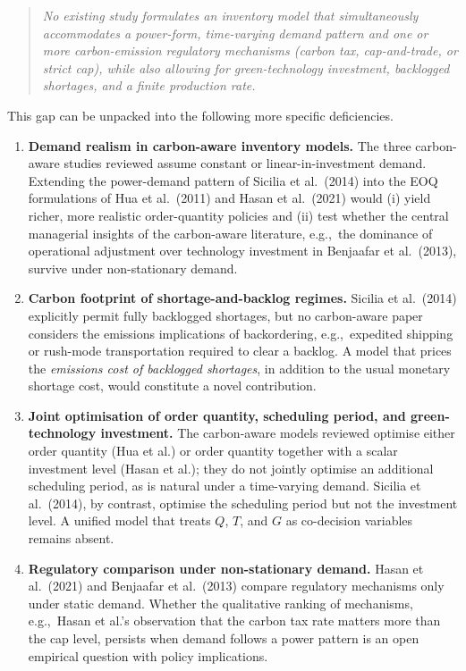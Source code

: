 \documentclass[11pt,a4paper]{article}
\begin{document}
\begin{quote}
\textit{No existing study formulates an inventory model that
simultaneously accommodates a power-form, time-varying demand pattern
and one or more carbon-emission regulatory mechanisms (carbon tax,
cap-and-trade, or strict cap), while also allowing for green-technology
investment, backlogged shortages, and a finite production rate.}
\end{quote}

\noindent
This gap can be unpacked into the following more specific deficiencies.

\begin{enumerate}[label=\textbf{G\arabic*.},leftmargin=2.4em,itemsep=0.4em]

\item \textbf{Demand realism in carbon-aware inventory models.}
The three carbon-aware studies reviewed assume constant or
linear-in-investment demand. Extending the power-demand pattern of
Sicilia et al.\ (2014) into the EOQ formulations of Hua et al.\ (2011)
and Hasan et al.\ (2021) would (i) yield richer, more realistic
order-quantity policies and (ii) test whether the central
managerial insights of the carbon-aware literature, e.g.,\ the dominance
of operational adjustment over technology investment in
Benjaafar et al.\ (2013), survive under non-stationary demand.

\item \textbf{Carbon footprint of shortage-and-backlog regimes.}
Sicilia et al.\ (2014) explicitly permit fully backlogged shortages, but
no carbon-aware paper considers the emissions implications of
backordering, e.g.,\ expedited shipping or rush-mode transportation
required to clear a backlog. A model that prices the
\emph{emissions cost of backlogged shortages}, in addition to the usual
monetary shortage cost, would constitute a novel contribution.

\item \textbf{Joint optimisation of order quantity, scheduling period, and green-technology investment.}
The carbon-aware models reviewed optimise either order quantity (Hua
et al.) or order quantity together with a scalar investment level
(Hasan et al.); they do not jointly optimise an additional scheduling
period, as is natural under a time-varying demand. Sicilia et al.\
(2014), by contrast, optimise the scheduling period but not the
investment level. A unified model that treats $Q$, $T$, and $G$ as
co-decision variables remains absent.

\item \textbf{Regulatory comparison under non-stationary demand.}
Hasan et al.\ (2021) and Benjaafar et al.\ (2013) compare regulatory
mechanisms only under static demand. Whether the qualitative ranking of
mechanisms, e.g.,\ Hasan et al.'s observation that the carbon tax rate
matters more than the cap level, persists when demand follows a power
pattern is an open empirical question with policy implications.


\end{enumerate}
\end{document}
